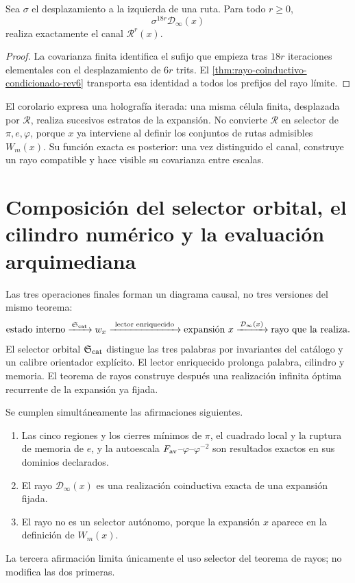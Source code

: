 \begin{corollary}
\label{cor:covarianza-rayo-729-rev6}
Sea \(\sigma\) el desplazamiento a la izquierda de una ruta. Para todo
\(r\geq0\),
\[
\sigma^{18r}\mathcal D_\infty(x)
\]
realiza exactamente el canal \(\mathcal R^r(x)\).
\end{corollary}

\begin{proof}
La covarianza finita identifica el sufijo que empieza tras \(18r\)
iteraciones elementales
con el desplazamiento de \(6r\) trits. El
\cref{thm:rayo-coinductivo-condicionado-rev6} transporta esa identidad a
todos los prefijos del rayo límite.
\end{proof}

El corolario expresa una holografía iterada: una misma célula finita,
desplazada por \(\mathcal R\), realiza sucesivos estratos de la expansión.
No convierte \(\mathcal R\) en selector de \(\pi,e,\varphi\), porque
\(x\) ya interviene al definir los conjuntos de rutas admisibles
\(W_m(x)\). Su función exacta es posterior: una vez distinguido el canal,
construye un rayo compatible y hace visible su covarianza entre escalas.

\section{Composición del selector orbital, el cilindro numérico y la evaluación arquimediana}

Las tres operaciones finales forman un diagrama causal, no tres versiones
del mismo teorema:
\[
\text{estado interno}
\xrightarrow{\,\mathfrak S_{\rm cat}\,}
w_x
\xrightarrow{\ \text{lector enriquecido}\ }
\text{expansión }x
\xrightarrow{\,\mathcal D_\infty(x)\,}
\text{rayo que la realiza}.
\]
El selector orbital \(\mathfrak S_{\rm cat}\) distingue las tres palabras
por invariantes del catálogo y un calibre orientador explícito. El lector
enriquecido prolonga palabra, cilindro y memoria. El teorema de rayos
construye después una realización infinita óptima recurrente de la expansión
ya fijada.

\begin{proposition}
\label{prop:tipado-biografias-rayos-selector-rev6}
Se cumplen simultáneamente las afirmaciones siguientes.
\begin{enumerate}
\item Las cinco regiones y los cierres mínimos de \(\pi\), el cuadrado local
y la ruptura de memoria de \(e\), y la autoescala
\(F_{\rm av}\)--\(\varphi\)--\(\varphi^{-2}\) son resultados exactos en
sus dominios declarados.
\item El rayo \(\mathcal D_\infty(x)\) es una realización coinductiva exacta
de una expansión fijada.
\item El rayo no es un selector autónomo, porque la expansión \(x\) aparece
en la definición de \(W_m(x)\).
\end{enumerate}
La tercera afirmación limita únicamente el uso selector del teorema de
rayos; no modifica las dos primeras.
\end{proposition}

